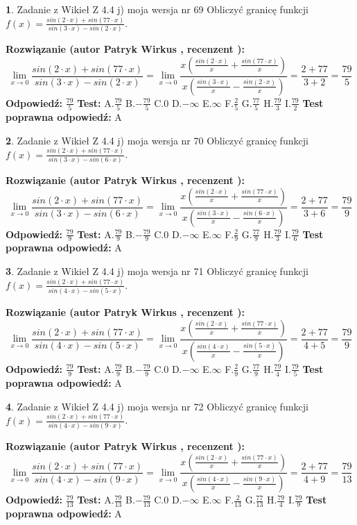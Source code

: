 \documentclass[12pt, a4paper]{article}
\theoremstyle{definition} %
\newtheorem{zad}{}
\newcommand{\zadStart}[1]{\begin{zad}#1\newline}
\newcommand{\zadStop}{\end{zad}}
\newcommand{\rozwStart}[2]{\noindent \textbf{Rozwiązanie (autor #1 , recenzent #2): }\newline}
\newcommand{\rozwStop}{\newline}
\newcommand{\odpStart}{\noindent \textbf{Odpowiedź:}\newline}
\newcommand{\odpStop}{\newline}
\newcommand{\testStart}{\noindent \textbf{Test:}\newline}
\newcommand{\testStop}{\newline}
\newcommand{\kluczStart}{\noindent \textbf{Test poprawna odpowiedź:}\newline}
\newcommand{\kluczStop}{\newline}
\begin{document}
\zadStart{Zadanie z Wikieł Z 4.4 j) moja wersja nr 69}
Obliczyć granicę funkcji $f(x)=\frac{sin(2\cdot x) +sin(77\cdot x)}{sin(3\cdot x) -sin(2\cdot x)}$.
\zadStop
\rozwStart{Patryk Wirkus}{}
$$\lim\limits_{x\to 0}\frac{sin(2\cdot x) +sin(77\cdot x)}{sin(3\cdot x) -sin(2\cdot x)}=\lim\limits_{x\to 0}\frac{x(\frac{sin(2\cdot x)}{x}+\frac{sin(77\cdot x)}{x})}{x(\frac{sin(3\cdot x)}{x}-\frac{sin(2\cdot x)}{x})}=\frac{2+77}{3+2} = \frac{79}{5}$$
\rozwStop
\odpStart
$\frac{79}{5}$
\odpStop
\testStart
A.$\frac{79}{5}$
B.$-\frac{79}{5}$
C.$0$
D.$-\infty$
E.$\infty$
F.$\frac{2}{5}$
G.$\frac{77}{5}$
H.$\frac{79}{3}$
I.$\frac{79}{2}$
\testStop
\kluczStart
A
\kluczStop



\zadStart{Zadanie z Wikieł Z 4.4 j) moja wersja nr 70}
Obliczyć granicę funkcji $f(x)=\frac{sin(2\cdot x) +sin(77\cdot x)}{sin(3\cdot x) -sin(6\cdot x)}$.
\zadStop
\rozwStart{Patryk Wirkus}{}
$$\lim\limits_{x\to 0}\frac{sin(2\cdot x) +sin(77\cdot x)}{sin(3\cdot x) -sin(6\cdot x)}=\lim\limits_{x\to 0}\frac{x(\frac{sin(2\cdot x)}{x}+\frac{sin(77\cdot x)}{x})}{x(\frac{sin(3\cdot x)}{x}-\frac{sin(6\cdot x)}{x})}=\frac{2+77}{3+6} = \frac{79}{9}$$
\rozwStop
\odpStart
$\frac{79}{9}$
\odpStop
\testStart
A.$\frac{79}{9}$
B.$-\frac{79}{9}$
C.$0$
D.$-\infty$
E.$\infty$
F.$\frac{2}{9}$
G.$\frac{77}{9}$
H.$\frac{79}{3}$
I.$\frac{79}{6}$
\testStop
\kluczStart
A
\kluczStop



\zadStart{Zadanie z Wikieł Z 4.4 j) moja wersja nr 71}
Obliczyć granicę funkcji $f(x)=\frac{sin(2\cdot x) +sin(77\cdot x)}{sin(4\cdot x) -sin(5\cdot x)}$.
\zadStop
\rozwStart{Patryk Wirkus}{}
$$\lim\limits_{x\to 0}\frac{sin(2\cdot x) +sin(77\cdot x)}{sin(4\cdot x) -sin(5\cdot x)}=\lim\limits_{x\to 0}\frac{x(\frac{sin(2\cdot x)}{x}+\frac{sin(77\cdot x)}{x})}{x(\frac{sin(4\cdot x)}{x}-\frac{sin(5\cdot x)}{x})}=\frac{2+77}{4+5} = \frac{79}{9}$$
\rozwStop
\odpStart
$\frac{79}{9}$
\odpStop
\testStart
A.$\frac{79}{9}$
B.$-\frac{79}{9}$
C.$0$
D.$-\infty$
E.$\infty$
F.$\frac{2}{9}$
G.$\frac{77}{9}$
H.$\frac{79}{4}$
I.$\frac{79}{5}$
\testStop
\kluczStart
A
\kluczStop



\zadStart{Zadanie z Wikieł Z 4.4 j) moja wersja nr 72}
Obliczyć granicę funkcji $f(x)=\frac{sin(2\cdot x) +sin(77\cdot x)}{sin(4\cdot x) -sin(9\cdot x)}$.
\zadStop
\rozwStart{Patryk Wirkus}{}
$$\lim\limits_{x\to 0}\frac{sin(2\cdot x) +sin(77\cdot x)}{sin(4\cdot x) -sin(9\cdot x)}=\lim\limits_{x\to 0}\frac{x(\frac{sin(2\cdot x)}{x}+\frac{sin(77\cdot x)}{x})}{x(\frac{sin(4\cdot x)}{x}-\frac{sin(9\cdot x)}{x})}=\frac{2+77}{4+9} = \frac{79}{13}$$
\rozwStop
\odpStart
$\frac{79}{13}$
\odpStop
\testStart
A.$\frac{79}{13}$
B.$-\frac{79}{13}$
C.$0$
D.$-\infty$
E.$\infty$
F.$\frac{2}{13}$
G.$\frac{77}{13}$
H.$\frac{79}{4}$
I.$\frac{79}{9}$
\testStop
\kluczStart
A
\kluczStop
\end{document}

